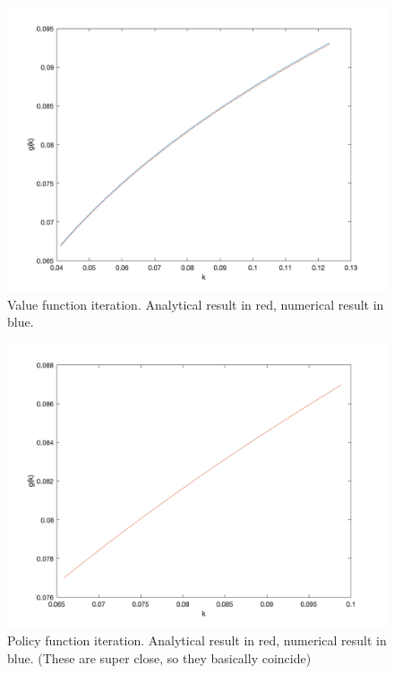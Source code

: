 \documentclass[10pt,letter]{article}
\begin{document}
\begin{figure}
\includegraphics[scale=0.4]{ps3q2_valueiteration}
\caption{Value function iteration. Analytical result in red, numerical result in blue.}
\end{figure}
\begin{figure}
\includegraphics[scale=0.4]{ps3q2_policyiteration}
\caption{Policy function iteration. Analytical result in red, numerical result in blue. (These are super close, so they basically coincide)}
\end{figure}

\pagebreak
\end{document}
